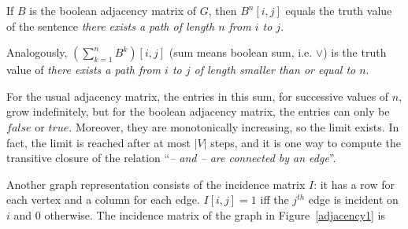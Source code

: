 If $B$ is the boolean adjacency matrix of $G$, then $B^{n}[i,j]$
equals the truth value of the sentence {\em there exists a path of
length $n$ from $i$ to $j$}.

Analogously, $(\sum_{k=1}^{n} B^{k})[i,j]$ (sum means boolean sum,
i.e. $\vee$) is the truth value of {\em there exists a path from $i$
to $j$ of length smaller than or equal to $n$}.

For the usual adjacency matrix, the entries in this sum, for
successive values of $n$, grow indefinitely, but for the boolean
adjacency matrix, the entries can only be $false$ or $true$. Moreover,
they are monotonically increasing, so the limit exists. In fact, the
limit is reached after at most $|V|$ steps, and it is one way to
compute the transitive closure of the relation ``{\em -- and -- are connected by an
edge}''.

Another graph representation consists of the incidence matrix $I$: it
has a row for each vertex and a column for each edge. $I[i,j] = 1$
iff the $j^{th}$ edge is incident on $i$ and 0 otherwise.  The
incidence matrix of the graph in Figure~\ref{adjacency1} is

